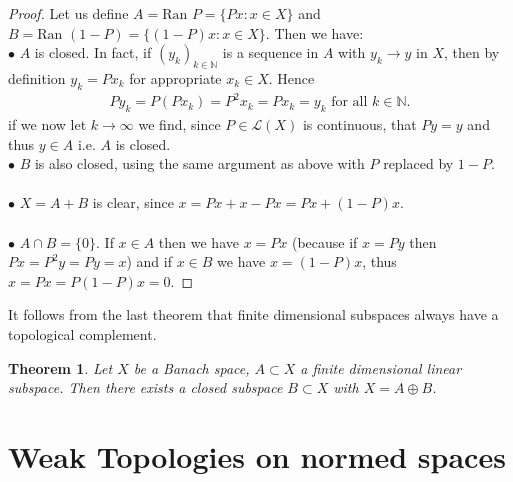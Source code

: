 \documentclass[11pt,a4paper]{article}
\newtheorem{thm}{Theorem}[section]
\theoremstyle{definition}
\begin{document}
\begin{proof}
Let us define $A= \text{Ran } P = \lbrace Px: x \in X\rbrace$ and $B= \text{Ran } (1-P)= \lbrace (1-P)x: x \in X \rbrace$. Then we have:
\\
$\bullet$ $A$ is closed. In fact, if $(y_k)_{k \in \mathbb{N}}$ is a sequence in $A$ with $y_k \to y$ in $X$, then by definition $y_k = P{x_k}$ for appropriate $x_k \in X$. Hence
\begin{align*}
Py_k = P(P{x_k})=P^2x_k = Px_k = y_k \text{ for all } k \in \mathbb{N}.
\end{align*}
if we now let $k \to \infty$ we find, since $P \in \mathcal{L}(X)$ is continuous, that $Py=y$ and thus $y \in A$ i.e. $A$ is closed. 
\\
$\bullet$ $B$ is also closed, using the same argument as above with $P$ replaced by $1-P$. 
\\\\
$\bullet$ $X=A+B$ is clear, since $x=Px + x -Px = Px + (1-P)x$.
\\\\
$\bullet$ $A \cap B = \lbrace 0 \rbrace$. If $x \in A$ then we have $x=Px$ (because if $x=Py$ then $Px=P^2y=Py=x$) and if $x \in B$ we have $x=(1-P)x$, thus $x=Px=P(1-P)x=0$. 
\end{proof}
It follows from the last theorem that finite dimensional subspaces always have a topological complement.
\begin{thm} Let $X$ be a Banach space, $A \subset X$ a finite dimensional linear subspace. Then there exists a closed subspace $B \subset X$ with $X = A \oplus B$. 
\end{thm}
\newpage
\section{Weak Topologies on normed spaces}
\end{document}
